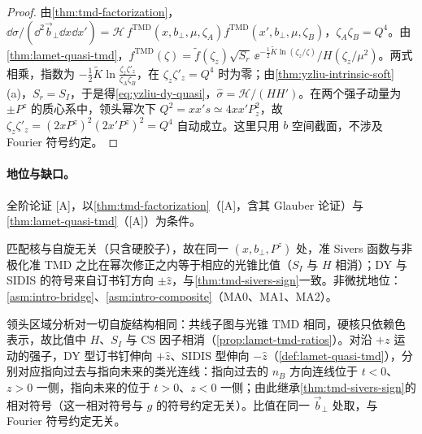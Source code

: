 \begin{proof}
由\cref{thm:tmd-factorization}，$\dd\sigma/(\dd^2\vec b_\perp\dd x\dd x')=\mathcal H\,f^{\mathrm{TMD}}(x,b_\perp,\mu,\zeta_A)f^{\mathrm{TMD}}(x',b_\perp,\mu,\zeta_B)$，$\zeta_A\zeta_B=Q^4$。由\cref{thm:lamet-quasi-tmd}，$f^{\mathrm{TMD}}(\zeta)=\tilde f(\zeta_z)\sqrt{S_r}\,\ee^{-\frac12\tilde K\ln(\zeta_z/\zeta)}/H(\zeta_z/\mu^2)$。两式相乘，指数为 $-\frac12\tilde K\ln\frac{\zeta_z\zeta'_z}{\zeta_A\zeta_B}$，在 $\zeta_z\zeta'_z=Q^4$ 时为零；由\cref{thm:yzliu-intrinsic-soft}(a)，$S_r=S_I$，于是得\cref{eq:yzliu-dy-quasi}，$\hat\sigma=\mathcal H/(HH')$。在两个强子动量为 $\pm P^z$ 的质心系中，领头幂次下 $Q^2=xx's\simeq4xx'P_z^2$，故 $\zeta_z\zeta'_z=(2xP^z)^2(2x'P^z)^2=Q^4$ 自动成立。这里只用 $b$ 空间截面，不涉及 Fourier 符号约定。
\end{proof}

\paragraph{地位与缺口。}全阶论证 [A]，以\cref{thm:tmd-factorization}（[A]，含其 Glauber 论证）与\cref{thm:lamet-quasi-tmd}（[A]）为条件\cite[式~(22)]{Ji:2019sxk}\cite[式~(27)]{Ji:2019ewn}\cite[式~(155)]{Liu:2022nnk}。

\begin{proposition}\label{prop:yzliu-sivers}
匹配核与自旋无关（只含硬胶子），故在同一 $(x,b_\perp,P^z)$ 处，准 Sivers 函数与非极化准 TMD 之比在幂次修正之内等于相应的光锥比值（$S_I$ 与 $H$ 相消）；DY 与 SIDIS 的符号来自订书钉方向 $\pm\hat z$，与\cref{thm:tmd-sivers-sign}一致。非微扰地位：\cref{asm:intro-bridge}、\cref{asm:intro-composite}（MA0、MA1、MA2）。
\end{proposition}

\begin{proofsketch}
领头区域分析对一切自旋结构相同\cite[第~I--II~节]{Ji:2020jeb}：共线子图与光锥 TMD 相同，硬核只依赖色表示，故比值中 $H$、$S_I$ 与 CS 因子相消（\cref{prop:lamet-tmd-ratios}）。对沿 $+z$ 运动的强子，DY 型订书钉伸向 $+\hat z$、SIDIS 型伸向 $-\hat z$（\cref{def:lamet-quasi-tmd}），分别对应指向过去与指向未来的类光连线：指向过去的 $n_B$ 方向连线位于 $t<0$、$z>0$ 一侧，指向未来的位于 $t>0$、$z<0$ 一侧；由此继承\cref{thm:tmd-sivers-sign}的相对符号（这一相对符号与 $g$ 的符号约定无关）。比值在同一 $\vec b_\perp$ 处取，与 Fourier 符号约定无关。
\end{proofsketch}

